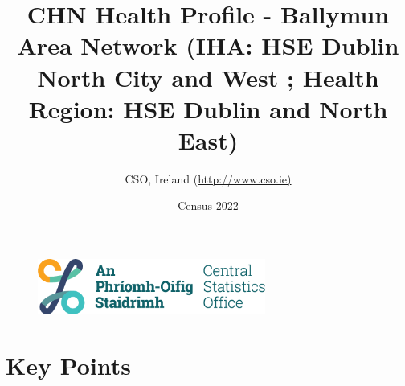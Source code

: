 \documentclass{article}
\title{CHN Health Profile - Ballymun Area Network (IHA: HSE Dublin North City and West ;  Health Region: HSE Dublin and North East) }
\date{Census 2022}
\author{CSO, Ireland  (\url{http://www.cso.ie)}}
\begin{document}


\begin{figure}
	\centering
\includegraphics[width =75mm]{../figures/CSO_Logo.png}
\end{figure}

				 
		   
						  
														  
																																													
												 
			 
\maketitle
					
													   
				 
						 
																																																																											   
				 
				  
  \pagebreak
    	    \tableofcontents

\pagebreak


\section{Key Points}
\end{document}
